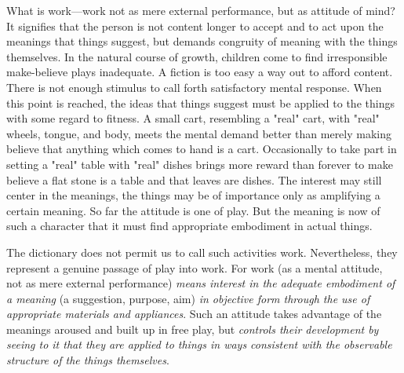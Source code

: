\documentclass[showtrims,ustradepaper]{memoir}
\begin{document}

What is work---work not as mere external
performance,
but as attitude of mind? It signifies that the person is not content
longer to accept and to act upon the meanings that things suggest, but
demands congruity of meaning with the things themselves. In the natural
course of growth, children come to find irresponsible make-believe plays
inadequate. A fiction is too easy a way out to afford content. There is
not enough stimulus to call forth satisfactory mental response. When
this point is reached, the ideas that things suggest must be applied to
the things with some regard to fitness. A small cart, resembling a
"real" cart, with "real" wheels, tongue, and body, meets the mental
demand better than merely making believe that anything which comes to
hand is a cart. Occasionally to take part in setting a "real" table with
"real" dishes brings more reward than forever to make believe a flat
stone is a table and that leaves are dishes. The interest may still
center in the meanings, the things may be of importance only as
amplifying a certain meaning. So far the attitude is one of play. But
the meaning is now of such a character that it must find appropriate
embodiment in actual things.

The dictionary does not permit us to call such activities work.
Nevertheless, they represent a genuine passage of play into work. For
work (as a mental attitude, not as mere external performance)
\emph{means interest in the adequate embodiment of a meaning} (a
suggestion, purpose, aim) \emph{in objective form through the use of
appropriate materials and appliances}. Such an attitude takes advantage
of the meanings aroused and built up in free play, but \emph{controls
their development by seeing to it that they are applied to things in
ways consistent with the observable structure of the things
themselves}.

\end{document}

